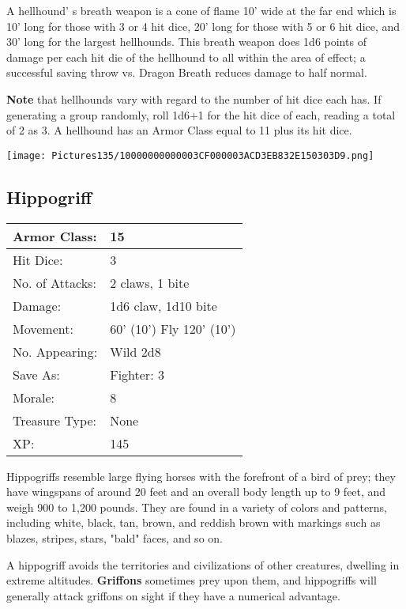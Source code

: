 \documentclass[a4paper,twoside,openany,10pt]{book}
\begin{document}
\begin{multicols}{2}
A hellhound' s breath weapon is a cone of flame 10' wide at the far end which is 10' long for those with 3 or 4 hit dice, 20' long for those with 5 or 6 hit dice, and 30' long for the largest hellhounds. This breath weapon does 1d6 points of damage per each hit die of the hellhound to all within the area of effect; a successful saving throw vs. Dragon Breath reduces damage to half normal. 

\textbf{Note} that hellhounds vary with regard to the number of hit dice each has. If generating a group randomly, roll 1d6+1 for the hit dice of each, reading a total of 2 as 3. A hellhound has an Armor Class equal to 11 plus its hit dice.


\begin{center}
	\texttt{[image: Pictures135/10000000000003CF000003ACD3EB832E150303D9.png]}
\end{center}

\subsection*{Hippogriff}\label{hippogriff}

\begin{tabularx}{0.48\textwidth}{@{}lX@{}}
Armor Class: & 15 \\\hline
Hit Dice: & 3 \\\hline
No. of Attacks: & 2 claws, 1 bite \\\hline
Damage: & 1d6 claw, 1d10 bite \\\hline
Movement: & 60' (10') Fly
120' (10') \\\hline
No. Appearing: & Wild 2d8 \\\hline
Save As: & Fighter: 3 \\\hline
Morale: & 8 \\\hline
Treasure Type: & None \\\hline
XP: & 145 \\\hline
\end{tabularx}\medskip

Hippogriffs resemble large flying horses with the forefront of a bird of prey; they have wingspans of around 20 feet and an overall body length up to 9 feet, and weigh 900 to 1,200 pounds. They are found in a variety of colors and patterns, including white, black, tan, brown, and reddish brown with markings such as blazes, stripes, stars, "bald" faces, and so on.

A hippogriff avoids the territories and civilizations of other creatures, dwelling in extreme altitudes. \textbf{Griffons} sometimes prey upon them, and hippogriffs will generally attack griffons on sight if they have a numerical advantage.


\end{multicols}
\end{document}
